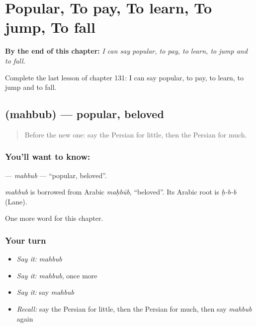 
\chapter{Popular, To pay, To learn, To jump, To fall}
\label{ch:fa-popular-to-pay-to-learn-to-jump-to-fall}

\begin{chapteropening}
\textbf{By the end of this chapter:} \emph{I can say popular, to pay, to learn, to jump and to fall.}

Complete the last lesson of chapter 131: I can say popular, to pay, to learn, to jump and to fall.
\end{chapteropening}

\section[\texorpdfstring{\fa{محبوب} (mahbub)}{محبوب (mahbub)}]{ (mahbub) — popular, beloved}

\label{lesson:FA-C131-mahbub}



\begin{quote}
Before the new one: say the Persian for little, then the Persian for much.
\end{quote}

\subsection*{You'll want to know: }
\textbf{} — \emph{mahbub} — \textquotedblleft{}popular, beloved\textquotedblright{}.

\begin{cousinweb}
\emph{mahbub} is borrowed from Arabic \emph{maḥbūb}, \textquotedblleft{}beloved\textquotedblright{}. Its Arabic root is \emph{ḥ-b-b} (Lane).
\end{cousinweb}

\begin{grammarlens}[title={What you've built}]
One more word for this chapter.
\end{grammarlens}

\subsection*{Your turn}
\begin{itemize}
\raggedright
  \item \emph{Say it:} \emph{mahbub}
  \item \emph{Say it:} \emph{mahbub}, once more
  \item \emph{Say it:} say \emph{mahbub}
  \item \emph{Recall:} say the Persian for little, then the Persian for much, then say \emph{mahbub} again
\end{itemize}

